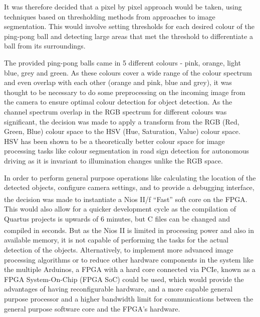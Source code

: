 \documentclass[a4paper]{article}
\begin{document}
It was therefore decided that a pixel by pixel approach would be taken, using techniques
based on thresholding methods from approaches to image segmentation. This would
involve setting thresholds for each desired colour of the ping-pong ball and detecting large 
areas that met the threshold to differentiate a ball from its surroundings. 

The provided ping-pong balls came in 5 different colours - pink, orange, light 
blue, grey and green. As these colours cover a wide range of the colour spectrum
and even overlap with each other (orange and pink, blue and grey), it was thought 
to be necessary to do some preprocessing on the incoming image from the camera 
to ensure optimal colour detection for object detection.  
As the channel spectrum overlap in the RGB spectrum for different colours was significant, the decision was made to apply
a transform from the RGB (Red, Green, Blue) colour space to the HSV (Hue, 
Saturation, Value) colour space.  HSV has been shown to be a theoretically better colour space
for image processing tasks like colour segmentation in road sign detection for 
autonomous driving as it is invariant to illumination changes unlike the RGB 
space.\cite{ali2013performance} 

In order to perform general purpose operations like
    calculating the location of the detected objects,
    configure camera settings,
    and to provide a debugging interface,
the decision was made to instantiate a Nios\textsuperscript{\textregistered} II/f ``Fast'' soft core on the FPGA. 
This would also allow for a quicker development cycle as the compilation of Quartus projects
is upwards of 6 minutes, but C files can be changed and compiled in seconds. But as the Nios\textsuperscript{\textregistered} II 
is limited in processing power and also in available memory, it is not capable of performing 
the tasks for the actual detection of the objects.  
Alternatively, to implement more advanced image processing algorithms
or to reduce other hardware components in the system like the multiple Arduinos, 
a FPGA with a hard core connected via PCIe, 
known as a FPGA System-On-Chip (FPGA SoC) \cite{FPGASoC} could be used, 
which would provide the advantages of having reconfigurable hardware, and
a more capable general purpose processor and a higher bandwidth limit for communications
between the general purpose software core and the FPGA's hardware. 
\end{document}
